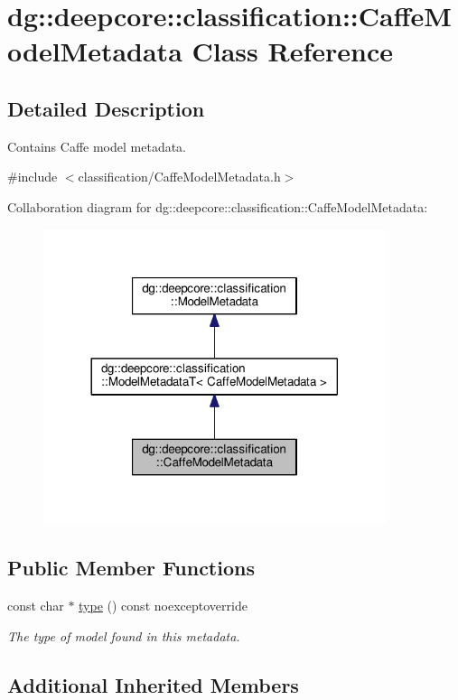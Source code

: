 \hypertarget{structdg_1_1deepcore_1_1classification_1_1_caffe_model_metadata}{}\section{dg\+:\+:deepcore\+:\+:classification\+:\+:Caffe\+Model\+Metadata Class Reference}
\label{structdg_1_1deepcore_1_1classification_1_1_caffe_model_metadata}


\subsection{Detailed Description}
Contains Caffe model metadata. 

{\ttfamily \#include $<$classification/\+Caffe\+Model\+Metadata.\+h$>$}



Collaboration diagram for dg\+:\+:deepcore\+:\+:classification\+:\+:Caffe\+Model\+Metadata\+:
\nopagebreak
\begin{figure}[H]
\begin{center}
\leavevmode
\includegraphics[width=284pt]{structdg_1_1deepcore_1_1classification_1_1_caffe_model_metadata__coll__graph}
\end{center}
\end{figure}
\subsection*{Public Member Functions}
\begin{DoxyCompactItemize}
\item 
const char $\ast$ \hyperlink{group___classification_module_ga8681b7b38c886f71e1f680501088cf89}{type} () const noexceptoverride
\begin{DoxyCompactList}\small\item\em The type of model found in this metadata. \end{DoxyCompactList}\end{DoxyCompactItemize}
\subsection*{Additional Inherited Members}
